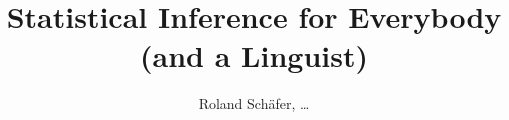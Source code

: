 \author{Roland Schäfer, \ldots}
\title{Statistical Inference for Everybody (and a Linguist)}
\subtitle{}
\renewcommand{\lsSeries}{tbls}
\renewcommand{\lsSeriesNumber}{}


\def\lsBookDOI{}
\def\lsISBNhardcover{}
\def\lsISBNsoftcover{}
\def\lsISBNdigital{}
\def\lsID{}
